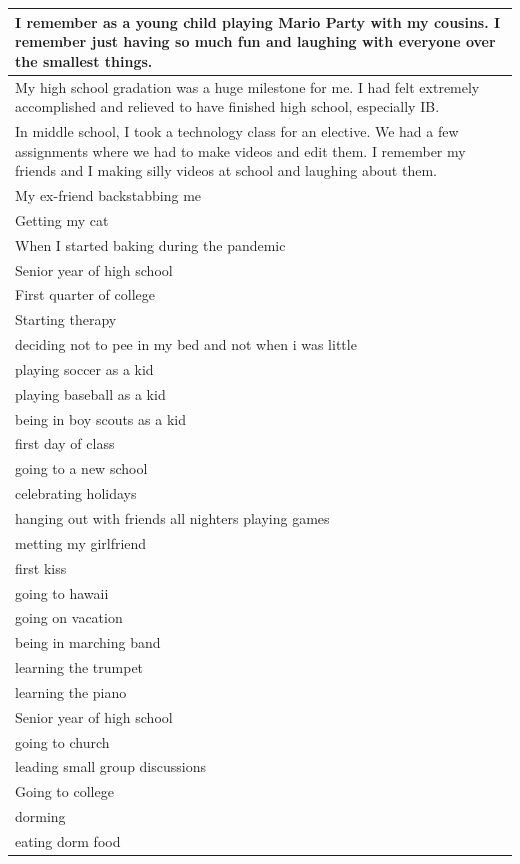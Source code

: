 \documentclass[
  .7em,
  letterpaper,
  DIV=11,
  numbers=noendperiod]{scrartcl}
\begin{document}
\begin{table}
\begin{tabular}{l}
\hline
I remember as a young child playing Mario Party with my cousins. I remember just having so much fun and laughing with everyone over the smallest things.\\
\hline
My high school gradation was a huge milestone for me. I had felt extremely accomplished and relieved to have finished high school, especially IB.\\
\hline
In middle school, I took a technology class for an elective. We had a few assignments where we had to make videos and edit them. I remember my friends and I making silly videos at school and laughing about them.\\
\hline
My ex-friend backstabbing me\\
\hline
Getting my cat\\
\hline
When I started baking during the pandemic\\
\hline
Senior year of high school\\
\hline
First quarter of college\\
\hline
Starting therapy\\
\hline
deciding not to pee in my bed and not when i was little\\
\hline
playing soccer as a kid\\
\hline
playing baseball as a kid\\
\hline
being in boy scouts as a kid\\
\hline
first day of class\\
\hline
going to a new school\\
\hline
celebrating holidays\\
\hline
hanging out with friends all nighters playing games\\
\hline
metting my girlfriend\\
\hline
first kiss\\
\hline
going to hawaii\\
\hline
going on vacation\\
\hline
being in marching band\\
\hline
learning the trumpet\\
\hline
learning the piano\\
\hline
Senior year of high school\\
\hline
going to church\\
\hline
leading small group discussions\\
\hline
Going to college\\
\hline
dorming\\
\hline
eating dorm food\\

\end{tabular}
\end{table}
\end{document}
